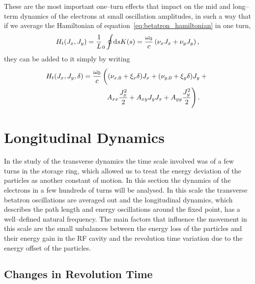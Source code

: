     These are the most important one--turn effects that impact on the mid and long--term dynamics of the electrons at small oscillation amplitudes, in such a way that if we average the Hamiltonian of equation~\eqref{eq:betatron_hamiltonian} in one turn,
    \begin{align}
        H_t(J_x, J_y) = \frac1L_0\oint\!\text{d}s K(s) = \frac{\omega_0}{c}\left(\nu_xJ_x + \nu_yJ_y\right),
    \end{align}
    they can be added to it simply by writing
    \begin{align}\label{eq:average_transverse_hamiltonian}\nonumber
        H_t(J_x, J_y, \delta) = \frac{\omega_0}{c}
                                &\left(
                                    (\nu_{x,0} + \xi_x \delta) J_x +
                                    (\nu_{y,0} + \xi_y \delta) J_y +
                                \vphantom{\frac{1_1^2}{2}}\right.\\ &\left.
                              \,\,\,A_{xx} \frac{J_x^2}{2} + A_{xy} J_yJ_x +
                                    A_{yy} \frac{J_y^2}{2}
                                \right).
    \end{align}

\section{Longitudinal Dynamics}

    In the study of the transverse dynamics the time scale involved was of a few turns in the storage ring, which allowed us to treat the energy deviation of the particles as another constant of motion. In this section the dynamics of the electrons in a few hundreds of turns will be analysed. In this scale the transverse betatron oscillations are averaged out and the longitudinal dynamics, which describes the path length and energy oscillations around the fixed point, has a well--defined natural frequency. The main factors that influence the movement in this scale are the small unbalances between the energy loss of the particles and their energy gain in the RF cavity and the revolution time variation due to the energy offset of the particles.

\subsection{Changes in Revolution Time}\label{sec:longitudinal_deviations}

